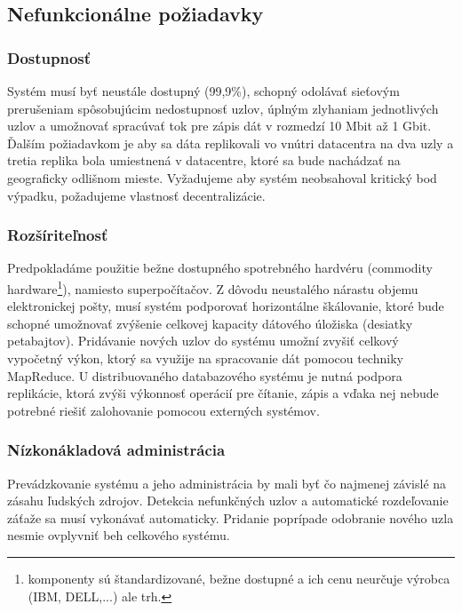 \documentclass[11pt,twoside,a4paper]{book}
\begin{document}



\subsection{Nefunkcionálne požiadavky}

\subsubsection*{Dostupnosť}
Systém musí byť neustále dostupný (99,9\%), schopný odolávať sieťovým prerušeniam spôsobujúcim nedostupnosť uzlov, úplným zlyhaniam jednotlivých uzlov a umožnovať spracúvať tok pre zápis dát v rozmedzí 10 Mbit až 1 Gbit. Ďalším požiadavkom je aby sa dáta replikovali vo vnútri datacentra na dva uzly a tretia replika bola umiestnená v datacentre, ktoré sa bude nachádzať na geograficky odlišnom mieste. Vyžadujeme aby systém neobsahoval kritický bod výpadku, požadujeme vlastnosť decentralizácie.

\subsubsection*{Rozšíriteľnosť}
Predpokladáme použitie bežne dostupného spotrebného hardvéru (commodity hardware\footnote{komponenty sú štandardizované, bežne dostupné a ich cenu neurčuje výrobca (IBM, DELL,...) ale trh.}), namiesto superpočítačov. Z dôvodu neustalého nárastu objemu elektronickej pošty, musí systém podporovať horizontálne škálovanie, ktoré bude schopné umožnovať zvýšenie celkovej kapacity dátového úložiska (desiatky petabajtov). Pridávanie nových uzlov do systému umožní zvyšiť celkový vypočetný výkon, ktorý sa využije na spracovanie dát pomocou techniky MapReduce. U distribuovaného databazového systému je nutná podpora replikácie, ktorá zvýši výkonnosť operácií pre čítanie, zápis a vďaka nej nebude potrebné riešiť zalohovanie pomocou externých systémov.

\subsubsection*{Nízkonákladová administrácia}
Prevádzkovanie systému a jeho administrácia by mali byť čo najmenej závislé na zásahu ľudských zdrojov. Detekcia nefunkčných uzlov a automatické rozdeľovanie záťaže sa musí vykonávať automaticky. Pridanie poprípade odobranie nového uzla nesmie ovplyvniť beh celkového systému.
\end{document}
